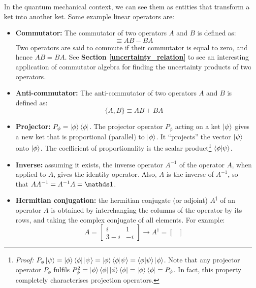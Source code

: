 In the quantum mechanical context, we can see them as entities that transform a ket into another ket. Some example linear operators are:
\begin{itemize}
    \item \textbf{Commutator:} The commutator of two operators $A$ and $B$ is defined as:
    \begin{equation}
        [A, B] \equiv AB - BA
    \end{equation}
    Two operators are said to commute if their commutator is equal to zero, and hence $AB = BA$. See \textbf{Section \ref{uncertainty_relation}} to see an interesting application of commutator algebra for finding the uncertainty products of two operators.
    \item \textbf{Anti-commutator:} The anti-commutator of two operators $A$ and $B$ is defined as:
    \begin{equation}
        \{A, B\} \equiv AB + BA
    \end{equation}
    \item \textbf{Projector:} $P_\phi = \ket{\phi}\bra{\phi}$. The projector operator $P_\phi$ acting on a ket $\ket{\psi}$ gives a new ket that is proportional (parallel) to $\ket{\phi}$. It ``projects'' the vector $\ket{\psi}$ onto $\ket{\phi}$. The coefficient of proportionality is the scalar product\footnote{\textit{Proof:} $P_\phi\ket{\psi} = \ket{\phi}\bra{\phi}\ket{\psi} = \ket{\phi}\braket{\phi|\psi} = \braket{\phi|\psi}\ket{\phi}$. Note that any projector operator $P_\phi$ fulfils $P_\phi^2 = \ket{\phi}\bra{\phi}\ket{\phi}\bra{\phi} = \ket{\phi}\bra{\phi} = P_\phi$. In fact, this property completely characterises projection operators.} $\braket{\phi|\psi}$.
    \item \textbf{Inverse:} assuming it exists, the inverse operator $A^{-1}$ of the operator $A$, when applied to $A$, gives the identity operator. Also, $A$ is the inverse of $A^{-1}$, so that $AA^{-1} = A^{-1}A = \Imat$.
    \item \textbf{Hermitian conjugation:} the hermitian conjugate (or adjoint) $A^\dagger$ of an operator $A$ is obtained by interchanging the columns of the operator by its rows, and taking the complex conjugate of all elements. For example:
    \begin{equation}
        A = \begin{bmatrix}
            i & 1 \\
            3-i & -i
        \end{bmatrix}\rightarrow
        A^\dagger = \begin{bmatrix}

\end{bmatrix}
\end{equation}
\end{itemize}
